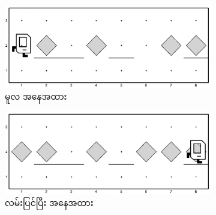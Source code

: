 \begin{figure}[tbh!]
    \newcommand{\figpctw}{0.48}
    \newcommand{\figscale}{0.15}
    \begin{subfigure}[t]{{\figpctw}\textwidth}
        \includegraphics[scale=\figscale]{images/ch02/st_repair/init.jpg}
        \caption{မူလ အနေအထား}    
    \end{subfigure}
    \begin{subfigure}[t]{{\figpctw}\textwidth}
        \includegraphics[scale=\figscale]{images/ch02/st_repair/after.jpg}
        \caption{လမ်းပြင်ပြီး အနေအထား}    
    \end{subfigure}
    \caption{}
    \label{fig:st_repair}
\end{figure}



        
%
